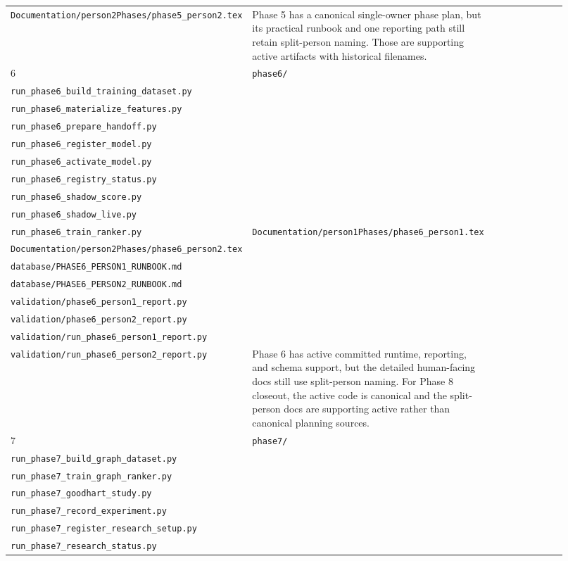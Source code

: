 \documentclass{article}
\begin{document}
\begin{longtable}{p{0.08\linewidth}p{0.31\linewidth}p{0.27\linewidth}p{0.26\linewidth}}
\texttt{Documentation/person2Phases/phase5\_person2.tex}
&
Phase 5 has a canonical single-owner phase plan, but its practical runbook and one reporting path still retain split-person naming. Those are supporting active artifacts with historical filenames. \\
6 &
\texttt{phase6/}\\
\texttt{run\_phase6\_build\_training\_dataset.py}\\
\texttt{run\_phase6\_materialize\_features.py}\\
\texttt{run\_phase6\_prepare\_handoff.py}\\
\texttt{run\_phase6\_register\_model.py}\\
\texttt{run\_phase6\_activate\_model.py}\\
\texttt{run\_phase6\_registry\_status.py}\\
\texttt{run\_phase6\_shadow\_score.py}\\
\texttt{run\_phase6\_shadow\_live.py}\\
\texttt{run\_phase6\_train\_ranker.py}
&
\texttt{Documentation/person1Phases/phase6\_person1.tex}\\
\texttt{Documentation/person2Phases/phase6\_person2.tex}\\
\texttt{database/PHASE6\_PERSON1\_RUNBOOK.md}\\
\texttt{database/PHASE6\_PERSON2\_RUNBOOK.md}\\
\texttt{validation/phase6\_person1\_report.py}\\
\texttt{validation/phase6\_person2\_report.py}\\
\texttt{validation/run\_phase6\_person1\_report.py}\\
\texttt{validation/run\_phase6\_person2\_report.py}
&
Phase 6 has active committed runtime, reporting, and schema support, but the detailed human-facing docs still use split-person naming. For Phase 8 closeout, the active code is canonical and the split-person docs are supporting active rather than canonical planning sources. \\
7 &
\texttt{phase7/}\\
\texttt{run\_phase7\_build\_graph\_dataset.py}\\
\texttt{run\_phase7\_train\_graph\_ranker.py}\\
\texttt{run\_phase7\_goodhart\_study.py}\\
\texttt{run\_phase7\_record\_experiment.py}\\
\texttt{run\_phase7\_register\_research\_setup.py}\\
\texttt{run\_phase7\_research\_status.py}\\

\end{longtable}
\end{document}

